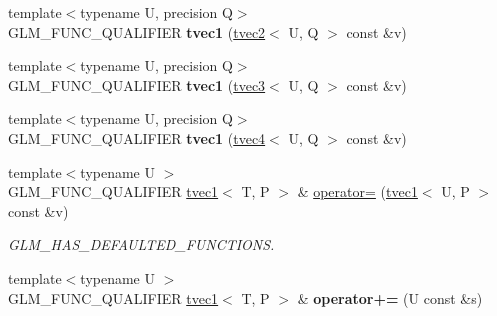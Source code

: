 \begin{DoxyCompactItemize}
\item 
\hypertarget{structglm_1_1tvec1_aa4a3f51c325290246b45719118a931fd}{{\footnotesize template$<$typename U, precision Q$>$ }\\G\-L\-M\-\_\-\-F\-U\-N\-C\-\_\-\-Q\-U\-A\-L\-I\-F\-I\-E\-R {\bfseries tvec1} (\hyperlink{structglm_1_1tvec2}{tvec2}$<$ U, Q $>$ const \&v)}\label{structglm_1_1tvec1_aa4a3f51c325290246b45719118a931fd}

\item 
\hypertarget{structglm_1_1tvec1_a32fc712ec0ad96609a4137fabc8f77c4}{{\footnotesize template$<$typename U, precision Q$>$ }\\G\-L\-M\-\_\-\-F\-U\-N\-C\-\_\-\-Q\-U\-A\-L\-I\-F\-I\-E\-R {\bfseries tvec1} (\hyperlink{structglm_1_1tvec3}{tvec3}$<$ U, Q $>$ const \&v)}\label{structglm_1_1tvec1_a32fc712ec0ad96609a4137fabc8f77c4}

\item 
\hypertarget{structglm_1_1tvec1_a5b66e4f092edc2bb80b4edd12b9cb960}{{\footnotesize template$<$typename U, precision Q$>$ }\\G\-L\-M\-\_\-\-F\-U\-N\-C\-\_\-\-Q\-U\-A\-L\-I\-F\-I\-E\-R {\bfseries tvec1} (\hyperlink{structglm_1_1tvec4}{tvec4}$<$ U, Q $>$ const \&v)}\label{structglm_1_1tvec1_a5b66e4f092edc2bb80b4edd12b9cb960}

\item 
\hypertarget{structglm_1_1tvec1_afd831051f2b79ce40423c5c3c3113829}{{\footnotesize template$<$typename U $>$ }\\G\-L\-M\-\_\-\-F\-U\-N\-C\-\_\-\-Q\-U\-A\-L\-I\-F\-I\-E\-R \hyperlink{structglm_1_1tvec1}{tvec1}$<$ T, P $>$ \& \hyperlink{structglm_1_1tvec1_afd831051f2b79ce40423c5c3c3113829}{operator=} (\hyperlink{structglm_1_1tvec1}{tvec1}$<$ U, P $>$ const \&v)}\label{structglm_1_1tvec1_afd831051f2b79ce40423c5c3c3113829}

\begin{DoxyCompactList}\small\item\em G\-L\-M\-\_\-\-H\-A\-S\-\_\-\-D\-E\-F\-A\-U\-L\-T\-E\-D\-\_\-\-F\-U\-N\-C\-T\-I\-O\-N\-S. \end{DoxyCompactList}\item 
\hypertarget{structglm_1_1tvec1_a0420be0b9702aeb0a2e8754316d771de}{{\footnotesize template$<$typename U $>$ }\\G\-L\-M\-\_\-\-F\-U\-N\-C\-\_\-\-Q\-U\-A\-L\-I\-F\-I\-E\-R \hyperlink{structglm_1_1tvec1}{tvec1}$<$ T, P $>$ \& {\bfseries operator+=} (U const \&s)}\label{structglm_1_1tvec1_a0420be0b9702aeb0a2e8754316d771de}


\end{DoxyCompactItemize}
